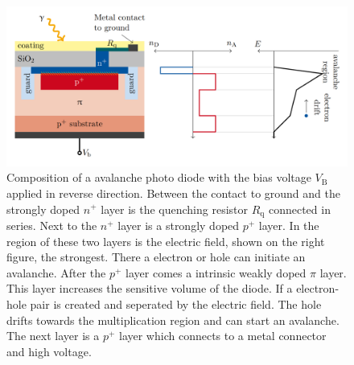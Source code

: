 \begin{figure}
	\centering
	\includegraphics[width=1.\textwidth]{pictures/pin_diode}
	\caption[Illustration of a APD.]{Composition of a avalanche photo diode with the bias voltage $V_\text{B}$ applied in reverse direction. Between the contact to ground and the strongly doped $n^+$ layer is the quenching resistor $R_\text{q}$ connected in series. Next to the $n^+$ layer is a strongly doped $p^+$ layer. In the region of these two layers is the electric field, shown on the right figure, the strongest. There a electron or hole can initiate an avalanche. After the $p^+$ layer comes a intrinsic weakly doped $\pi$ layer. This layer increases the sensitive volume of the diode. If a electron-hole pair is created and seperated by the electric field. The hole drifts towards the multiplication region and can start an avalanche. The next layer is a $p^+$ layer which connects to a metal connector and high voltage. \cite{}}
	\label{fig:pin_diode}
\end{figure}

